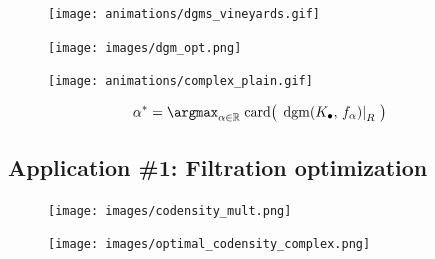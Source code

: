 \documentclass[
  letterpaper,
  DIV=11,
  numbers=noendperiod,
  oneside]{scrartcl}
\begin{document}
\begin{figure}

\begin{minipage}[b]{0.25\linewidth}

{\centering 

\texttt{[image: animations/dgms\_vineyards.gif]}

}

\end{minipage}%
%
\begin{minipage}[b]{0.50\linewidth}

{\centering 

\texttt{[image: images/dgm\_opt.png]}

}

\end{minipage}%
%
\begin{minipage}[b]{0.25\linewidth}

{\centering 

\texttt{[image: animations/complex\_plain.gif]}

}

\end{minipage}%

\end{figure}

\[ 
\alpha^\ast = \argmax_{\alpha \in \mathbb{R}} \; \mathrm{card}\big(\, \left.\mathrm{dgm}(K_\bullet, \, f_\alpha) \right|_{R} \, \big) 
\]

\subsection{Application \#1: Filtration
optimization}\label{application-1-filtration-optimization-1}

\begin{figure}

\begin{minipage}[b]{0.67\linewidth}

{\centering 

\texttt{[image: images/codensity\_mult.png]}

}

\end{minipage}%
%
\begin{minipage}[b]{0.33\linewidth}

{\centering 

\texttt{[image: images/optimal\_codensity\_complex.png]}

}

\end{minipage}%

\end{figure}
\end{document}
